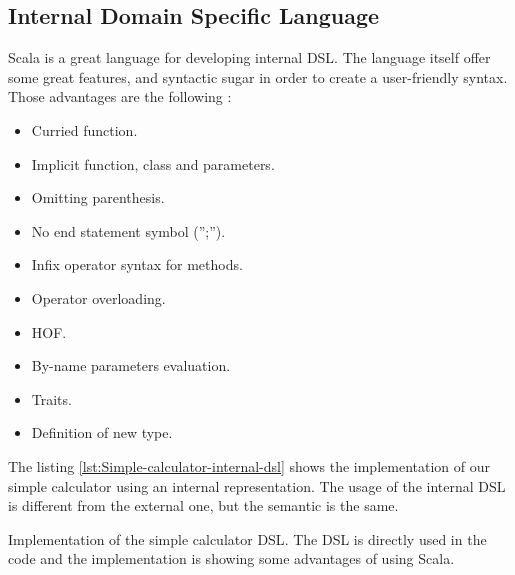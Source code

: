\subsection{Internal Domain Specific Language}
\label{subsec:scala_internal_dsl}

Scala is a great language for developing internal \gls{DSL}. The language itself
offer some great features, and syntactic sugar in order to create a user-friendly
syntax. Those advantages are the following \cite{filipkrikava2013}:

\begin{itemize}
\item Curried function.
\item Implicit function, class and parameters.
\item Omitting parenthesis.
\item No end statement symbol ('';'').
\item Infix operator syntax for methods.
\item Operator overloading.
\item \gls{HOF}.
\item By-name parameters evaluation.
\item Traits.
\item Definition of new type.
\end{itemize}

The listing \ref{lst:Simple-calculator-internal-dsl} shows the implementation of
our simple calculator using an internal representation. The usage of the
internal \gls{DSL} is different from the external one, but the semantic is the
same.

\begin{listing}[ht]
\centering
{}
\caption[Implementation of the simple calculator \gls{DSL}]{Implementation of
the simple calculator \gls{DSL}. The DSL is directly used in the code and
the implementation is showing some advantages of using Scala.}
\label{lst:Simple-calculator-internal-dsl}
\end{listing}

